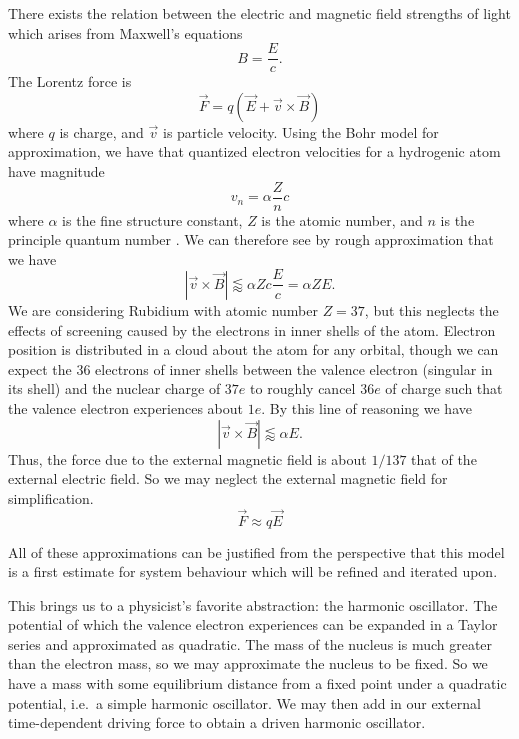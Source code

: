 \documentclass[aps,pra,showpacs,amsmath,amssymb,nofootinbib,longbibliography,superscriptaddress
]{revtex4-1}
\theoremstyle{definition}
\theoremstyle{remark}
\newcommand{\0}{\hat{0}}
\begin{document}
There exists the relation between the electric and magnetic field strengths of light which arises from Maxwell's equations
\begin{equation}
    B = \frac{E}{c}.
\end{equation}
The Lorentz force is
\begin{equation}
    \vec{F} = q \left(\vec{E} + \vec{v} \times \vec{B} \right)
\end{equation}
where $q$ is charge, and $\vec{v}$ is particle velocity. Using the Bohr model for approximation, we have that quantized electron velocities for a hydrogenic atom have magnitude
\begin{equation}
    v_n = \alpha \frac{Z}{n} c
\end{equation}
where $\alpha$ is the fine structure constant, $Z$ is the atomic number, and $n$ is the principle quantum number \cite{Atomic}. We can therefore see by rough approximation that we have
\begin{equation}
    |\vec{v} \times \vec{B}| \lessapprox \alpha Z c \frac{E}{c} = \alpha Z E.
\end{equation}
We are considering Rubidium with atomic number $Z = 37$, but this neglects the effects of screening caused by the electrons in inner shells of the atom. Electron position is distributed in a cloud about the atom for any orbital, though we can expect the $36$ electrons of inner shells between the valence electron (singular in its shell) and the nuclear charge of $37e$ to roughly cancel $36e$ of charge such that the valence electron experiences about $1e$. By this line of reasoning we have
\begin{equation}
    |\vec{v} \times \vec{B}| \lessapprox \alpha E.
\end{equation}
Thus, the force due to the external magnetic field is about $1/137$ that of the external electric field. So we may neglect the external magnetic field for simplification.
\begin{equation}
    \vec{F} \approx q \vec{E}
\end{equation}

All of these approximations can be justified from the perspective that this model is a first estimate for system behaviour which will be refined and iterated upon.

This brings us to a physicist's favorite abstraction: the harmonic oscillator. The potential of which the valence electron experiences can be expanded in a Taylor series and approximated as quadratic. The mass of the nucleus is much greater than the electron mass, so we may approximate the nucleus to be fixed. So we have a mass with some equilibrium distance from a fixed point under a quadratic potential, i.e.~a simple harmonic oscillator. We may then add in our external time-dependent driving force to obtain a driven harmonic oscillator.
\end{document}
